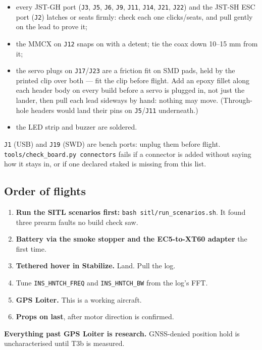 \documentclass[11pt,a4paper]{article}
\newcommand{\file}[1]{\texttt{\small #1}}
\newcommand{\cmd}[1]{\texttt{\small #1}}
\begin{document}
\begin{itemize}
\item every JST-GH port (\file{J3}, \file{J5}, \file{J6}, \file{J9}, \file{J11}, \file{J14},
\file{J21}, \file{J22}) and the JST-SH ESC port (\file{J2}) latches or seats firmly: check each one clicks/seats, and pull
gently on the lead to prove it;
\item the MMCX on \file{J12} snaps on with a detent; tie the coax down 10--15 mm from it;
\item the servo plugs on \file{J17}/\file{J23} are a friction fit on SMD pads, held by the
printed clip over both --- fit the clip before flight. Add an epoxy fillet along each header body
on every build before a servo is plugged in, not just the lander, then pull each lead sideways by hand:
nothing may move. (Through-hole headers would land their pins on \file{J5}/\file{J11} underneath.)
\item the LED strip and buzzer are soldered.
\end{itemize}

\file{J1} (USB) and \file{J19} (SWD) are bench ports: unplug them before flight.
\file{tools/check\_board.py connectors} fails if a connector is added without saying how it stays
in, or if one declared staked is missing from this list.

\subsection{Order of flights}

\begin{enumerate}
\item \textbf{Run the SITL scenarios first:} \cmd{bash sitl/run\_scenarios.sh}. It found
three prearm faults no build check saw.
\item \textbf{Battery via the smoke stopper and the EC5-to-XT60 adapter} the first time.
\item \textbf{Tethered hover in Stabilize.} Land. Pull the log.
\item Tune \file{INS\_HNTCH\_FREQ} and \file{INS\_HNTCH\_BW} from the log's FFT.
\item \textbf{GPS Loiter.} This is a working aircraft.
\item \textbf{Props on last}, after motor direction is confirmed.
\end{enumerate}

\textbf{Everything past GPS Loiter is research.} GNSS-denied position hold is
uncharacterised until T3b is measured.
\end{document}
